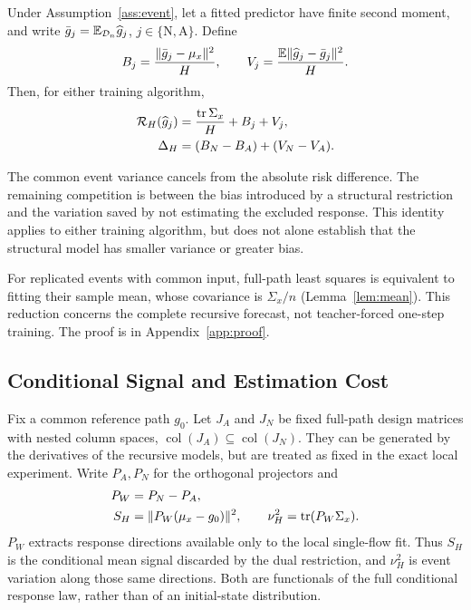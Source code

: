 \begin{proposition}
\label{prop:decomp}
Under Assumption~\ref{ass:event}, let a fitted predictor have finite second moment, and write $\bar g_j=\mathbb E_{\mathcal D_n}\widehat g_j$, $j\in\{\mathrm N,\mathrm A\}$. Define
\[
 B_j=\frac{\|\bar g_j-\mu_x\|^2}{H},\qquad
 V_j=\frac{\mathbb E\|\widehat g_j-\bar g_j\|^2}{H}.
\]
Then, for either training algorithm,
\begin{equation}
 \begin{aligned}
 \mathcal R_H(\widehat g_j)&=\frac{\operatorname{tr}\Sigma_x}{H}+B_j+V_j,\\
 \Delta_H&=(B_N-B_A)+(V_N-V_A).
 \end{aligned}
 \label{eq:bv_general}
\end{equation}
\end{proposition}
The common event variance cancels from the absolute risk difference. The remaining competition is between the bias introduced by a structural restriction and the variation saved by not estimating the excluded response. This identity applies to either training algorithm, but does not alone establish that the structural model has smaller variance or greater bias.

For replicated events with common input, full-path least squares is equivalent to fitting their sample mean, whose covariance is $\Sigma_x/n$ (Lemma~\ref{lem:mean}). This reduction concerns the complete recursive forecast, not teacher-forced one-step training. The proof is in Appendix~\ref{app:proof}.

\subsection{Conditional Signal and Estimation Cost}
Fix a common reference path $g_0$. Let $J_A$ and $J_N$ be fixed full-path design matrices with nested column spaces, $\operatorname{col}(J_A)\subseteq\operatorname{col}(J_N)$. They can be generated by the derivatives of the recursive models, but are treated as fixed in the exact local experiment. Write $P_A,P_N$ for the orthogonal projectors and
\[
 \begin{aligned}
 P_W&=P_N-P_A,\\
 S_H&=\|P_W(\mu_x-g_0)\|^2,\qquad
 \nu_H^2=\operatorname{tr}(P_W\Sigma_x).
 \end{aligned}
\]
$P_W$ extracts response directions available only to the local single-flow fit. Thus $S_H$ is the conditional mean signal discarded by the dual restriction, and $\nu_H^2$ is event variation along those same directions. Both are functionals of the full conditional response law, rather than of an initial-state distribution.

